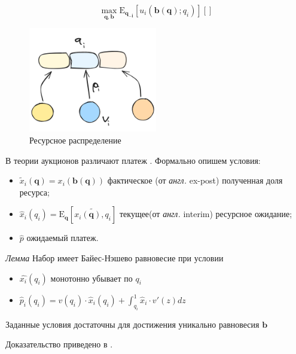 \begin{equation}
    \max_{\mathbf{q},\mathbf{b}} \mathrm{E}_{\mathbf{q_{-i}}}\left[u_i(\mathbf{b}(\mathbf{q});q_i)\right] \left[\right] 
\end{equation}

\begin{figure}[h]
    \centering
    \includegraphics[width=0.5\textwidth]{assets/pedagogic/social/mech.excalidraw.png}
    \caption{Ресурсное распределение}
    \label{utility}
\end{figure}


В теории \cite{bulow1989simple} аукционов различают платеж . Формально опишем условия: \begin{itemize}
    \item $\tilde{x}_i(\mathbf{q}) = x_i(\mathbf{b}(\mathbf{q}))$ фактическое (от \textit{англ.} ex-post) полученная доля ресурса;
    \item $\hat{x}_i(q_i) = \mathrm{E}_\mathbf{q} \left[\tilde{x_i(\mathbf{q}),q_i}\right]$ текущее(от \textit{англ.} interim) ресурсное ожидание;
    \item $\hat{p}$ ожидаемый платеж.
\end{itemize}



\textit{Лемма} Набор имеет Байес-Нэшево равновесие при условии \begin{itemize}
    \item $\hat{x_i}(q_i)$ монотонно убывает по $q_i$
    \item $\hat{p}_i(q_i) = v(q_i) \cdot \hat{x}_i(q_i) + \int_{q_i}^1 \hat{x}_i \cdot v'(z) dz$
\end{itemize}
Заданные условия достаточны для достижения уникально равновесия $\mathbf{b}$


Доказательство приведено в \cite{myerson1981optimal}.











